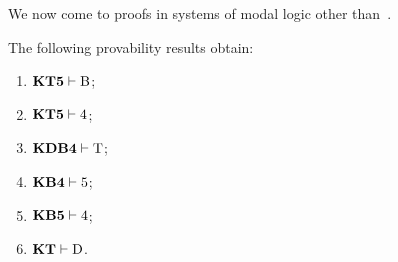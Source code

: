 \documentclass[../../../include/open-logic-section]{subfiles}
\begin{document}


We now come to proofs in systems of modal logic other than~.

\begin{prop}
The following provability results obtain:
  \begin{enumerate}
  \item $\Log{KT5} \Proves \Ax{B}$;
  \item $\Log{KT5} \Proves \Ax{4}$;
  \item $\Log{KDB4} \Proves \Ax{T}$;
  \item $\Log{KB4} \Proves \Ax{5}$;
  \item $\Log{KB5} \Proves \Ax{4}$;
  \item {}$\Log{KT} \Proves \Ax{D}$.
  \end{enumerate}
\end{prop}
\end{document}
